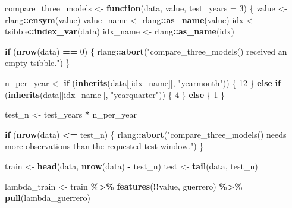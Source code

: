\documentclass[
  11pt,
]{article}
\newenvironment{Shaded}{\begin{snugshade}}{\end{snugshade}}
\newcommand{\AttributeTok}[1]{\textcolor[rgb]{0.13,0.29,0.53}{#1}}
\newcommand{\ControlFlowTok}[1]{\textcolor[rgb]{0.13,0.29,0.53}{\textbf{#1}}}
\newcommand{\DecValTok}[1]{\textcolor[rgb]{0.00,0.00,0.81}{#1}}
\newcommand{\FunctionTok}[1]{\textcolor[rgb]{0.13,0.29,0.53}{\textbf{#1}}}
\newcommand{\NormalTok}[1]{#1}
\newcommand{\OtherTok}[1]{\textcolor[rgb]{0.56,0.35,0.01}{#1}}
\newcommand{\SpecialCharTok}[1]{\textcolor[rgb]{0.81,0.36,0.00}{\textbf{#1}}}
\newcommand{\StringTok}[1]{\textcolor[rgb]{0.31,0.60,0.02}{#1}}
\begin{document}
\begin{Shaded}
\begin{Highlighting}[]
\NormalTok{compare\_three\_models }\OtherTok{\textless{}{-}} \ControlFlowTok{function}\NormalTok{(data, value, }\AttributeTok{test\_years =} \DecValTok{3}\NormalTok{) \{}
\NormalTok{  value }\OtherTok{\textless{}{-}}\NormalTok{ rlang}\SpecialCharTok{::}\FunctionTok{ensym}\NormalTok{(value)}
\NormalTok{  value\_name }\OtherTok{\textless{}{-}}\NormalTok{ rlang}\SpecialCharTok{::}\FunctionTok{as\_name}\NormalTok{(value)}
\NormalTok{  idx }\OtherTok{\textless{}{-}}\NormalTok{ tsibble}\SpecialCharTok{::}\FunctionTok{index\_var}\NormalTok{(data)}
\NormalTok{  idx\_name }\OtherTok{\textless{}{-}}\NormalTok{ rlang}\SpecialCharTok{::}\FunctionTok{as\_name}\NormalTok{(idx)}

  \ControlFlowTok{if}\NormalTok{ (}\FunctionTok{nrow}\NormalTok{(data) }\SpecialCharTok{==} \DecValTok{0}\NormalTok{) \{}
\NormalTok{    rlang}\SpecialCharTok{::}\FunctionTok{abort}\NormalTok{(}\StringTok{"compare\_three\_models() received an empty tsibble."}\NormalTok{)}
\NormalTok{  \}}

\NormalTok{  n\_per\_year }\OtherTok{\textless{}{-}} \ControlFlowTok{if}\NormalTok{ (}\FunctionTok{inherits}\NormalTok{(data[[idx\_name]], }\StringTok{"yearmonth"}\NormalTok{)) \{}
    \DecValTok{12}
\NormalTok{  \} }\ControlFlowTok{else} \ControlFlowTok{if}\NormalTok{ (}\FunctionTok{inherits}\NormalTok{(data[[idx\_name]], }\StringTok{"yearquarter"}\NormalTok{)) \{}
    \DecValTok{4}
\NormalTok{  \} }\ControlFlowTok{else}\NormalTok{ \{}
    \DecValTok{1}
\NormalTok{  \}}

\NormalTok{  test\_n }\OtherTok{\textless{}{-}}\NormalTok{ test\_years }\SpecialCharTok{*}\NormalTok{ n\_per\_year}

  \ControlFlowTok{if}\NormalTok{ (}\FunctionTok{nrow}\NormalTok{(data) }\SpecialCharTok{\textless{}=}\NormalTok{ test\_n) \{}
\NormalTok{    rlang}\SpecialCharTok{::}\FunctionTok{abort}\NormalTok{(}\StringTok{"compare\_three\_models() needs more observations than the requested test window."}\NormalTok{)}
\NormalTok{  \}}

\NormalTok{  train }\OtherTok{\textless{}{-}} \FunctionTok{head}\NormalTok{(data, }\FunctionTok{nrow}\NormalTok{(data) }\SpecialCharTok{{-}}\NormalTok{ test\_n)}
\NormalTok{  test }\OtherTok{\textless{}{-}} \FunctionTok{tail}\NormalTok{(data, test\_n)}

\NormalTok{  lambda\_train }\OtherTok{\textless{}{-}}\NormalTok{ train }\SpecialCharTok{\%\textgreater{}\%}
    \FunctionTok{features}\NormalTok{(}\SpecialCharTok{!!}\NormalTok{value, guerrero) }\SpecialCharTok{\%\textgreater{}\%}
    \FunctionTok{pull}\NormalTok{(lambda\_guerrero)}


\end{Highlighting}
\end{Shaded}
\end{document}
